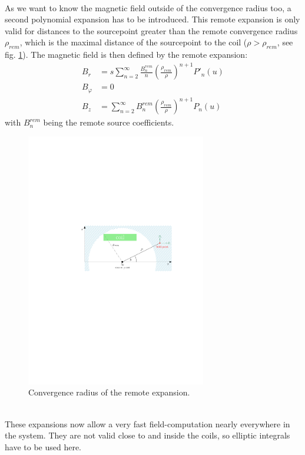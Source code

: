 	  \\
	As we want to know the magnetic field outside of the convergence radius too, a second polynomial expansion has to be introduced. This remote expansion is only valid for distances to the sourcepoint greater than the remote convergence radius $\rho_{rem}$, which is the maximal distance of the sourcepoint to the coil ($\rho > \rho_{rem}$, see fig. \ref{fig:remote convergence radius}). The magnetic field is then defined by the remote expansion:
	\begin{equation}
		\begin{aligned}
			B_r &= s\sum_{n=2}^{\infty} \frac{B_{n}^{rem}}{n} \left(\frac{\rho_{rem}}{\rho}\right)^{n+1}P'_n(u) \\
			B_{\varphi} &= 0 \\
			B_z &= \sum_{n=2}^{\infty} B_{n}^{rem}\left(\frac{\rho_{rem}}{\rho}\right)^{n+1}P_n(u) %
		\end{aligned}
		\label{eq:remote polynomial expansion}
	\end{equation}
	with $B_{n}^{rem}$ being the remote source coefficients.
	\begin{figure}[h]
		\centering \includegraphics[width=0.7\textwidth]{images/KAFCAFigures/legendre_remote.pdf}
		\caption{Convergence radius of the remote expansion.}
	  \label{fig:remote convergence radius}
	\end{figure}
	\\
	These expansions now allow a very fast field-computation nearly everywhere in the system. They are not valid close to and inside the coils, so elliptic integrals have to be used here.
